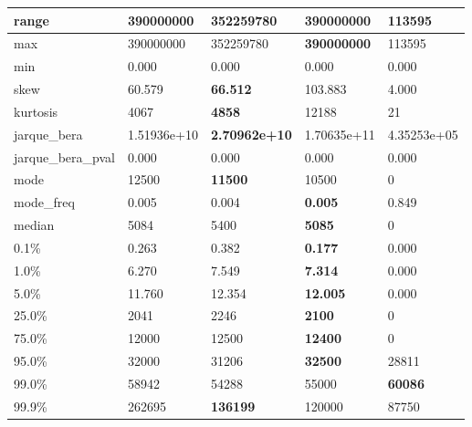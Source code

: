 \begin{table}[H]
\begin{tabular}{|l|m{10em}|m{10em}|m{10em}|m{10em}|}
\hline range & 390000000 & 352259780 & \bfseries 390000000 & \cellcolor[rgb]{0.9, 0.54, 0.52} 113595 \\
\hline max & 390000000 & 352259780 & \bfseries 390000000 & \cellcolor[rgb]{0.9, 0.54, 0.52} 113595 \\
\hline min & 0.000 & 0.000 & 0.000 & 0.000 \\
\hline skew & 60.579 & \bfseries 66.512 & 103.883 & \cellcolor[rgb]{0.9, 0.54, 0.52} 4.000 \\
\hline kurtosis & 4067 & \bfseries 4858 & \cellcolor[rgb]{0.9, 0.54, 0.52} 12188 & 21 \\
\hline jarque\_bera & 1.51936e+10 & \bfseries 2.70962e+10 & \cellcolor[rgb]{0.9, 0.54, 0.52} 1.70635e+11 & 4.35253e+05 \\
\hline jarque\_bera\_pval & 0.000 & 0.000 & 0.000 & 0.000 \\
\hline mode & 12500 & \bfseries 11500 & 10500 & \cellcolor[rgb]{0.9, 0.54, 0.52} 0 \\
\hline mode\_freq & 0.005 & 0.004 & \bfseries 0.005 & \cellcolor[rgb]{0.9, 0.54, 0.52} 0.849 \\
\hline median & 5084 & 5400 & \bfseries 5085 & \cellcolor[rgb]{0.9, 0.54, 0.52} 0 \\
\hline 0.1\% & 0.263 & 0.382 & \bfseries 0.177 & \cellcolor[rgb]{0.9, 0.54, 0.52} 0.000 \\
\hline 1.0\% & 6.270 & 7.549 & \bfseries 7.314 & \cellcolor[rgb]{0.9, 0.54, 0.52} 0.000 \\
\hline 5.0\% & 11.760 & 12.354 & \bfseries 12.005 & \cellcolor[rgb]{0.9, 0.54, 0.52} 0.000 \\
\hline 25.0\% & 2041 & 2246 & \bfseries 2100 & \cellcolor[rgb]{0.9, 0.54, 0.52} 0 \\
\hline 75.0\% & 12000 & 12500 & \bfseries 12400 & \cellcolor[rgb]{0.9, 0.54, 0.52} 0 \\
\hline 95.0\% & 32000 & 31206 & \bfseries 32500 & \cellcolor[rgb]{0.9, 0.54, 0.52} 28811 \\
\hline 99.0\% & 58942 & \cellcolor[rgb]{0.9, 0.54, 0.52} 54288 & 55000 & \bfseries 60086 \\
\hline 99.9\% & 262695 & \bfseries 136199 & 120000 & \cellcolor[rgb]{0.9, 0.54, 0.52} 87750 \\
\hline
\end{tabular}
\end{table}
